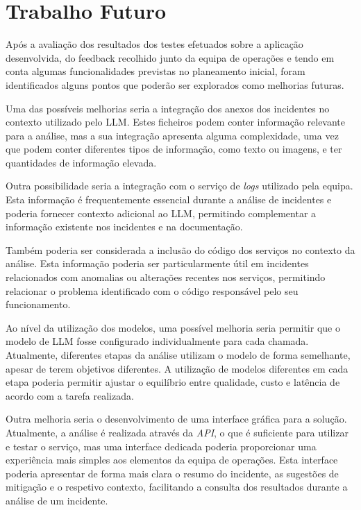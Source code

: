 \section{Trabalho Futuro}
	
	Após a avaliação dos resultados dos testes efetuados sobre a aplicação desenvolvida, do feedback recolhido junto da equipa de operações e tendo em conta algumas funcionalidades previstas no planeamento inicial, foram identificados alguns pontos que poderão ser explorados como melhorias futuras.
	
	Uma das possíveis melhorias seria a integração dos anexos dos incidentes no contexto utilizado pelo \gls{LLM}. Estes ficheiros podem conter informação relevante para a análise, mas a sua integração apresenta alguma complexidade, uma vez que podem conter diferentes tipos de informação, como texto ou imagens, e ter quantidades de informação elevada.
	
	Outra possibilidade seria a integração com o serviço de \textit{logs} utilizado pela equipa. Esta informação é frequentemente essencial durante a análise de incidentes e poderia fornecer contexto adicional ao \gls{LLM}, permitindo complementar a informação existente nos incidentes e na documentação.
	
	Também poderia ser considerada a inclusão do código dos serviços no contexto da análise. Esta informação poderia ser particularmente útil em incidentes relacionados com anomalias ou alterações recentes nos serviços, permitindo relacionar o problema identificado com o código responsável pelo seu funcionamento.
	
	Ao nível da utilização dos modelos, uma possível melhoria seria permitir que o modelo de \gls{LLM} fosse configurado individualmente para cada chamada. Atualmente, diferentes etapas da análise utilizam o modelo de forma semelhante, apesar de terem objetivos diferentes. A utilização de modelos diferentes em cada etapa poderia permitir ajustar o equilíbrio entre qualidade, custo e latência de acordo com a tarefa realizada.
	
	Outra melhoria seria o desenvolvimento de uma interface gráfica para a solução. Atualmente, a análise é realizada através da \textit{API}, o que é suficiente para utilizar e testar o serviço, mas uma interface dedicada poderia proporcionar uma experiência mais simples aos elementos da equipa de operações. Esta interface poderia apresentar de forma mais clara o resumo do incidente, as sugestões de mitigação e o respetivo contexto, facilitando a consulta dos resultados durante a análise de um incidente.
	
